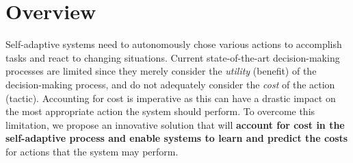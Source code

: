 \documentclass[12pt]{article}
\begin{document}
\begin{titlepage}
\begin{tabular}{ L{15mm} L{120mm} }



\end{tabular}




 \end{titlepage}

\cfoot{\thepage}
\setcounter{tocdepth}{1} %

\cfoot{} %








\setcounter{page}{1}



\section*{Overview}

Self-adaptive systems need to autonomously chose various actions to accomplish tasks and react to changing situations. Current state-of-the-art decision-making processes are limited since they merely consider the \emph{utility} (benefit) of the decision-making process, and do not adequately consider the \emph{cost} of the action (tactic). Accounting for cost is imperative as this can have a drastic impact on the most appropriate action the system should perform. To overcome this limitation, we propose an innovative solution that will \textbf{account for cost in the self-adaptive process and enable systems to learn and predict the costs} for actions that the system may perform.
\end{document}
